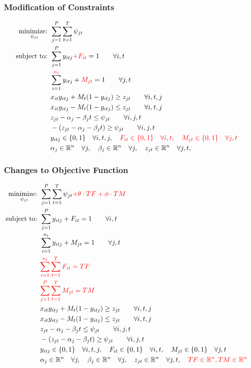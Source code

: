 \documentclass{beamer}
\begin{document}
\begin{frame}[shrink=20]
\frametitle{Modification of Constraints}
\begin{align*}
\underset{\psi_{jt}}{\text{minimize: }} & \sum_{j=1}^{P} \sum_{t=1}^{T} \psi_{jt} \\
\text{subject to: }	& \sum_{j=1}^{P} y_{itj} {\color{red}+ F_{it}} = 1 \qquad \forall i,t\nonumber \\
				& \sum_{i=1}^{{\color{red}n_{t}}} y_{itj} + {\color{red}M_{jt}} = 1 \qquad \forall j,t \\
				& x_{it}y_{itj} + M_{t}(1-y_{itj}) \geq z_{jt} \qquad \forall i,t,j\nonumber\\
				& x_{it}y_{itj} - M_{t}(1-y_{itj}) \leq z_{jt} \qquad \forall i,t,j\nonumber\\
				& z_{jt} - \alpha_{j} - \beta_{j}t \leq \psi_{jt} \qquad \forall i,j,t\nonumber\\
				& -(z_{jt} - \alpha_{j} - \beta_{j}t) \geq \psi_{jt} \qquad \forall i,j,t\nonumber\\
			 	& y_{itj} \in \{0,1\} \quad \forall i,t,j, \color{red}{\quad F_{it} \in \{0,1\} \quad \forall i,t,\quad M_{jt} \in \{0,1\} \quad \forall j,t}\\
				& \alpha_{j} \in \mathbb{R}^n \quad \forall j,\quad \beta_{j} \in \mathbb{R}^n \quad \forall j, \quad z_{jt} \in \mathbb{R}^n \quad \forall j,t,
\end{align*}
\end{frame}


\begin{frame}[shrink=20]
\frametitle{Changes to Objective Function}
\begin{align*}
\underset{\psi_{jt}}{\text{minimize: }} & \sum_{j=1}^{P} \sum_{t=1}^{T} \psi_{jt} \color{red}{+ \theta \cdot TF + \phi \cdot TM} \\
\text{subject to: }	& \sum_{j=1}^{P} y_{itj} + F_{it} = 1 \qquad \forall i,t \nonumber \\
				& \sum_{i=1}^{n_{t}} y_{itj} + M_{jt} = 1 \qquad \forall j,t \nonumber\\
				& \color{red}{\sum_{i=1}^{n_{t}} \sum_{t=1}^{T} F_{it} = TF} \nonumber \\
				& \color{red}{\sum_{j=1}^{P} \sum_{t=1}^{T} M_{jt} = TM} \nonumber \\
				& x_{it}y_{itj} + M_{t}(1-y_{itj}) \geq z_{jt} \qquad \forall i,t,j\nonumber\\
				& x_{it}y_{itj} - M_{t}(1-y_{itj}) \leq z_{jt} \qquad \forall i,t,j\nonumber\\
				& z_{jt} - \alpha_{j} - \beta_{j}t \leq \psi_{jt} \qquad \forall i,j,t\nonumber\\
				& -(z_{jt} - \alpha_{j} - \beta_{j}t) \geq \psi_{jt} \qquad \forall i,j,t\nonumber\\
			 	& y_{itj} \in \{0,1\} \quad \forall i,t,j, \quad F_{it} \in \{0,1\} \quad \forall i,t,\quad M_{jt} \in \{0,1\} \quad \forall j,t\\
				& \alpha_{j} \in \mathbb{R}^n \quad \forall j,\quad \beta_{j} \in \mathbb{R}^n \quad \forall j,\quad z_{jt} \in \mathbb{R}^n \quad \forall j,t,\quad \color{red}{TF \in \mathbb{R}^n,TM \in \mathbb{R}^n}\nonumber
\end{align*}
\end{frame}
\end{document}
